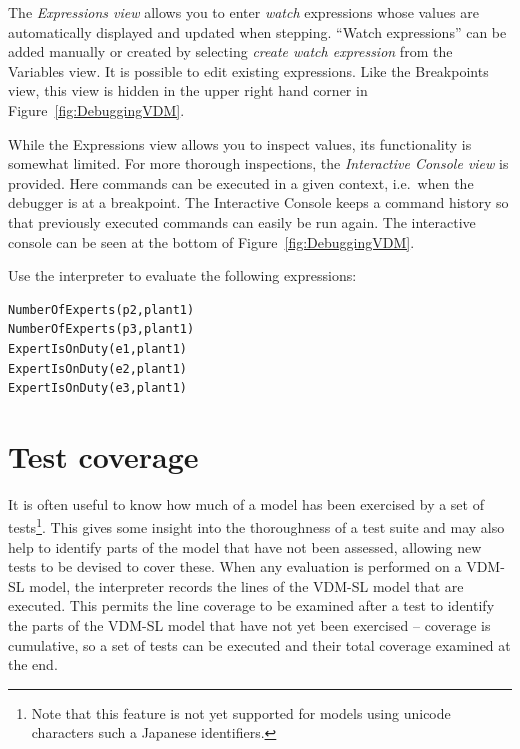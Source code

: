 The \emph{Expressions view} allows you to enter \emph{watch}
expressions whose values are automatically displayed and updated when
stepping. ``Watch expressions'' can be added manually or created by
selecting \emph{create watch expression} from the Variables view. It
is possible to edit existing expressions.  Like the Breakpoints view,
this view is hidden in the upper right hand corner in
Figure~\ref{fig:DebuggingVDM}.

While the Expressions view allows you to inspect values, its
functionality is somewhat limited. For more thorough inspections, the
\emph{Interactive Console view} is provided. Here commands can be
executed in a given context, i.e.\ when the debugger is at a
breakpoint. The Interactive Console keeps a command history so that
previously executed commands can easily be run again. The interactive
console can be seen at the bottom of
Figure~\ref{fig:DebuggingVDM}.

\begin{myexercise}
\label{ex:tool-monitor}Use the interpreter to evaluate the
  following expressions:
\begin{lstlisting}
NumberOfExperts(p2,plant1)
NumberOfExperts(p3,plant1)
ExpertIsOnDuty(e1,plant1)
ExpertIsOnDuty(e2,plant1)
ExpertIsOnDuty(e3,plant1)
\end{lstlisting}
\end{myexercise}


\section{Test coverage}\label{sec:testcov}

It is often useful to know how much of a model has been exercised by a
set of tests\footnote{Note that this feature is not yet supported for
  models using unicode characters such a Japanese identifiers.}. 
This gives some insight into the thoroughness of a test
suite and may also help to identify parts of the model that have not
been assessed, allowing new tests to be devised to cover these. When
any evaluation is performed on a VDM-SL model, the interpreter records
the lines of the VDM-SL model that are executed. This permits the line
coverage to be examined after a test to identify the parts of the
VDM-SL model that have not yet been exercised -- coverage is
cumulative, so a set of tests can be executed and their total coverage
examined at the end.


